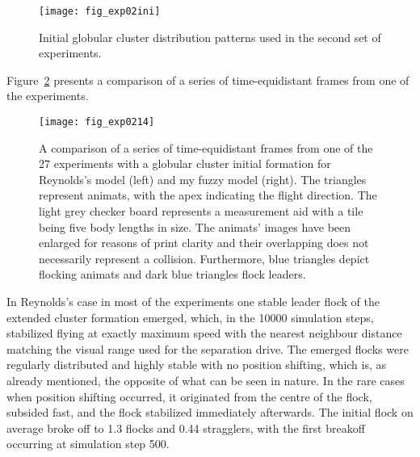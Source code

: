 \begin{figure}
  \texttt{[image: fig\_exp02ini]}
  \caption{Initial globular cluster distribution patterns used in the second set of experiments.}
  \label{fig:exp:02:ini}
\end{figure}

Figure~\ref{fig:exp:02:14} presents a comparison of a series of time-equidistant frames from one of the experiments.
%
\begin{figure}[!ht]
  \null\vspace*{1mm}
  \texttt{[image: fig\_exp0214]}
  \par\vspace*{1mm}
  \caption{A comparison of a series of time-equidistant frames from one of the 27 experiments with a globular cluster initial formation for Reynolds's model \cite{reynolds:1999} (left) and my fuzzy model (right). The triangles represent animats, with the apex indicating the flight direction. The light grey checker board represents a measurement aid with a tile being five body lengths in size. The animats' images have been enlarged for reasons of print clarity and their overlapping does not necessarily represent a collision. Furthermore, blue triangles depict flocking animats and dark blue triangles flock leaders.}
  \label{fig:exp:02:14}
\end{figure}
%
In Reynolds's case in most of the experiments one stable leader flock of the extended cluster formation emerged, which, in the 10000 simulation steps, stabilized flying at exactly maximum speed with the nearest neighbour distance matching the visual range used for the separation drive. The emerged flocks were regularly distributed and highly stable with no position shifting, which is, as already mentioned, the opposite of what can be seen in nature. In the rare cases when position shifting occurred, it originated from the centre of the flock, subsided fast, and the flock stabilized immediately afterwards. The initial flock on average broke off to 1.3 flocks and 0.44 stragglers, with the first breakoff occurring at simulation step 500.

